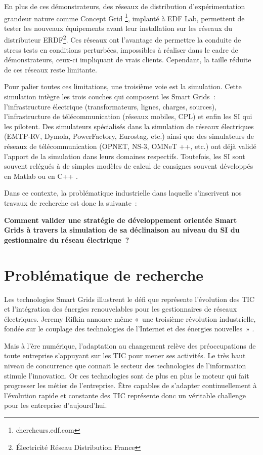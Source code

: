 En plus de ces démonstrateurs, des réseaux de distribution d'expérimentation 
grandeur nature comme Concept Grid \footnote{chercheurs.edf.com}, implanté à EDF Lab, permettent de tester les nouveaux équipements avant leur installation sur les réseaux du distributeur ERDF\footnote{Électricité Réseau Distribution France}. Ces réseaux ont l'avantage de permettre la conduite de stress tests en conditions perturbées, impossibles à réaliser dans le cadre de démonstrateurs, ceux-ci impliquant de vrais clients. Cependant, la taille réduite de ces réseaux reste limitante.

Pour palier toutes ces limitations, une troisième voie est la simulation. Cette simulation intègre les trois couches qui composent les Smart Grids~: 
l'infrastructure électrique (transformateurs, lignes, charges, sources), 
l'infrastructure de télécommunication (réseaux mobiles, CPL) et enfin les SI qui les pilotent. Des simulateurs spécialisés dans la simulation de réseaux électriques (EMTP-RV, Dymola, PowerFactory, Eurostag, etc.) ainsi que des simulateurs de réseaux de télécommunication (OPNET, NS-3, OMNeT ++, etc.) ont déjà validé l'apport de la simulation dans leurs domaines respectifs. Toutefois, les SI sont souvent relégués à de simples modèles de calcul de consignes souvent développés en Matlab ou en C++ \cite{palensky2014simulating}. 

Dans ce contexte, la problématique industrielle dans laquelle  s'inscrivent nos travaux de recherche est donc la suivante~: 

\textbf{Comment valider une stratégie de développement orientée Smart Grids à travers la simulation de sa déclinaison au niveau du SI du gestionnaire du 
réseau électrique~?}

 
\section{Problématique de recherche}
Les technologies Smart Grids illustrent le défi que représente l'évolution des TIC et l'intégration des énergies renouvelables pour les gestionnaires de réseaux électriques. Jeremy Rifkin annonce même «~une troisième révolution industrielle, fondée sur le couplage des technologies de l’Internet et des énergies nouvelles~» \cite{rifkin2012troisieme}. 

Mais à l'ère numérique, l'adaptation au changement relève des préoccupations de toute entreprise s'appuyant sur les TIC pour mener ses 
activités. Le très haut niveau de concurrence que connait le secteur des 
technologies de l'information stimule l'innovation. Or ces technologies sont de plus en plus le moteur qui fait progresser les  métier de l'entreprise. Être capables de s'adapter continuellement à l'évolution rapide et 
constante des TIC représente donc un véritable challenge pour les entreprise d'aujourd'hui. 

